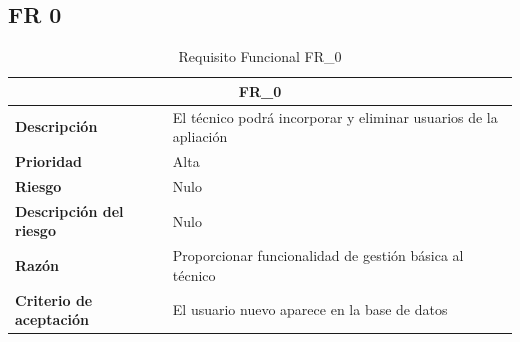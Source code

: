 \documentclass{scrreprt}
\begin{document}
\subsection{FR 0}

\begin{table}[H]
    \label{tab:my-table}
    \begin{tabular}{|p{5cm}|p{11cm}|}
    \hline
    \multicolumn{2}{|c|}{\textbf{FR_0}} \\
    \hline
    \textbf{Descripción  }                      & El técnico podrá incorporar y eliminar usuarios de la apliación  \\ \hline
    \textbf{Prioridad}                          & Alta \\ \hline
    \textbf{Riesgo}                          & Nulo \\ \hline
    \textbf{Descripción del riesgo}                    & Nulo  \\ \hline
    \textbf{Razón}                   & Proporcionar funcionalidad de gestión básica al técnico  \\ \hline
    \textbf{Criterio de aceptación}                    & El usuario nuevo aparece en la base de datos  \\ \hline
    \end{tabular}%
    \caption{Requisito Funcional FR_0}
\end{table}
\end{document}
